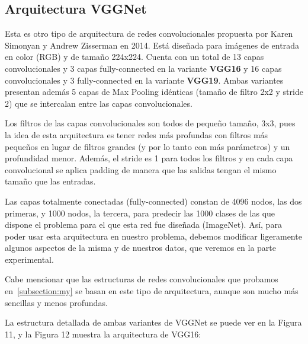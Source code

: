 \documentclass[a4paper,11pt]{article}
\begin{document}
\subsection{Arquitectura VGGNet}

Esta es otro tipo de arquitectura de redes convolucionales propuesta por Karen Simonyan y Andrew Zisserman en 2014. Está diseñada para imágenes de entrada en color (RGB) y de tamaño 224x224. Cuenta con un total de 13 capas convolucionales y 3 capas fully-connected en la variante \textbf{VGG16} y 16 capas convolucionales y 3 fully-connected en la variante \textbf{VGG19}. Ambas variantes presentan además 5 capas de Max Pooling idénticas (tamaño de filtro 2x2 y stride 2) que se intercalan entre las capas convolucionales. 

Los filtros de las capas convolucionales son todos de pequeño tamaño, 3x3, pues la idea de esta arquitectura es tener redes más profundas con filtros más pequeños en lugar de filtros grandes (y por lo tanto con más parámetros) y un profundidad menor. Además, el stride es 1 para todos los filtros y en cada capa convolucional se aplica padding de manera que las salidas tengan el mismo tamaño que las entradas.

Las capas totalmente conectadas (fully-connected) constan de 4096 nodos, las dos primeras, y 1000 nodos, la tercera, para predecir las 1000 clases de las que dispone el problema para el que esta red fue diseñada (ImageNet). Así, para poder usar esta arquitectura en nuestro problema, debemos modificar ligeramente algunos aspectos de la misma y de nuestros datos, que veremos en la parte experimental.

Cabe mencionar que las estructuras de redes convolucionales que probamos en~\ref{subsection:my} se basan en este tipo de arquitectura, aunque son mucho más sencillas y menos profundas. 

La estructura detallada de ambas variantes de VGGNet se puede ver en la Figura 11, y la Figura 12 muestra la arquitectura de VGG16:
\end{document}
